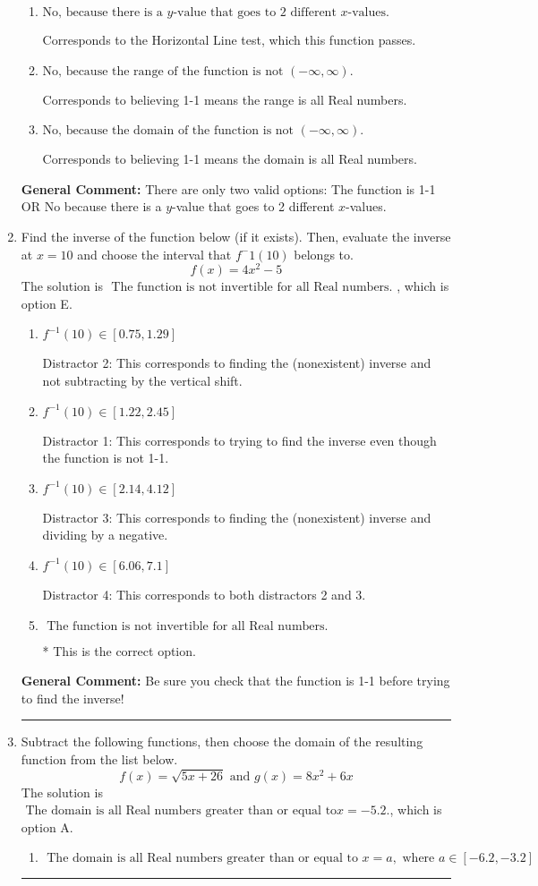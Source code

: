 \documentclass{extbook}[14pt]
\newcommand{\litem}[1]{\item #1

\rule{\textwidth}{0.4pt}}
\begin{document}
\begin{enumerate}
{\begin{enumerate}[label=\Alph*.]
Corresponds to the Vertical Line test, which checks if an expression is a function.
\item \( \text{No, because there is a $y$-value that goes to 2 different $x$-values.} \)

Corresponds to the Horizontal Line test, which this function passes.
\item \( \text{No, because the range of the function is not $(-\infty, \infty)$.} \)

Corresponds to believing 1-1 means the range is all Real numbers.
\item \( \text{No, because the domain of the function is not $(-\infty, \infty)$.} \)

Corresponds to believing 1-1 means the domain is all Real numbers.
\end{enumerate}

\textbf{General Comment:} There are only two valid options: The function is 1-1 OR No because there is a $y$-value that goes to 2 different $x$-values.
}
\litem{
Find the inverse of the function below (if it exists). Then, evaluate the inverse at $x = 10$ and choose the interval that $f^-1(10)$ belongs to.
\[ f(x) = 4 x^2 - 5 \]The solution is \( \text{ The function is not invertible for all Real numbers. } \), which is option E.\begin{enumerate}[label=\Alph*.]
\item \( f^{-1}(10) \in [0.75, 1.29] \)

 Distractor 2: This corresponds to finding the (nonexistent) inverse and not subtracting by the vertical shift.
\item \( f^{-1}(10) \in [1.22, 2.45] \)

 Distractor 1: This corresponds to trying to find the inverse even though the function is not 1-1. 
\item \( f^{-1}(10) \in [2.14, 4.12] \)

 Distractor 3: This corresponds to finding the (nonexistent) inverse and dividing by a negative.
\item \( f^{-1}(10) \in [6.06, 7.1] \)

 Distractor 4: This corresponds to both distractors 2 and 3.
\item \( \text{ The function is not invertible for all Real numbers. } \)

* This is the correct option.
\end{enumerate}

\textbf{General Comment:} Be sure you check that the function is 1-1 before trying to find the inverse!
}
\litem{
Subtract the following functions, then choose the domain of the resulting function from the list below.
\[ f(x) = \sqrt{5x+26}  \text{ and } g(x) = 8x^{2} +6 x \]The solution is \( \text{ The domain is all Real numbers greater than or equal to} x = -5.2. \), which is option A.\begin{enumerate}[label=\Alph*.]
\item \( \text{ The domain is all Real numbers greater than or equal to } x = a, \text{ where } a \in [-6.2, -3.2] \)



\end{enumerate}}
\end{enumerate}
\end{document}
